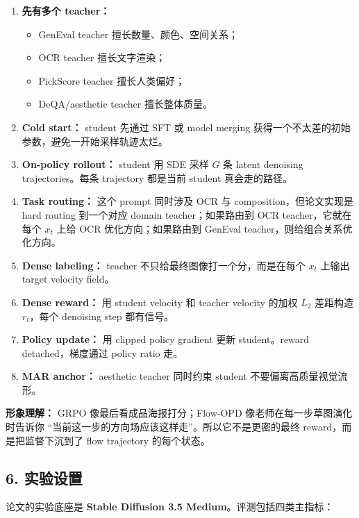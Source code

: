 \begin{enumerate}[leftmargin=1.5em]
  \item \textbf{先有多个 teacher：}
    \begin{itemize}[leftmargin=1.5em]
      \item GenEval teacher 擅长数量、颜色、空间关系；
      \item OCR teacher 擅长文字渲染；
      \item PickScore teacher 擅长人类偏好；
      \item DeQA/aesthetic teacher 擅长整体质量。
    \end{itemize}
  \item \textbf{Cold start：} student 先通过 SFT 或 model merging 获得一个不太差的初始参数，避免一开始采样轨迹太烂。
  \item \textbf{On-policy rollout：} student 用 SDE 采样 $G$ 条 latent denoising trajectories。每条 trajectory 都是当前 student 真会走的路径。
  \item \textbf{Task routing：} 这个 prompt 同时涉及 OCR 与 composition，但论文实现是 hard routing 到一个对应 domain teacher；如果路由到 OCR teacher，它就在每个 $x_t$ 上给 OCR 优化方向；如果路由到 GenEval teacher，则给组合关系优化方向。
  \item \textbf{Dense labeling：} teacher 不只给最终图像打一个分，而是在每个 $x_t$ 上输出 target velocity field。
  \item \textbf{Dense reward：} 用 student velocity 和 teacher velocity 的加权 $L_2$ 差距构造 $r_t$，每个 denoising step 都有信号。
  \item \textbf{Policy update：} 用 clipped policy gradient 更新 student。reward detached，梯度通过 policy ratio 走。
  \item \textbf{MAR anchor：} aesthetic teacher 同时约束 student 不要偏离高质量视觉流形。
\end{enumerate}

\begin{intubox}
\textbf{形象理解：} GRPO 像最后看成品海报打分；Flow-OPD 像老师在每一步草图演化时告诉你 ``当前这一步的方向场应该这样走''。所以它不是更密的最终 reward，而是把监督下沉到了 flow trajectory 的每个状态。
\end{intubox}

\subsection{6. 实验设置}

论文的实验底座是 \textbf{Stable Diffusion 3.5 Medium}。评测包括四类主指标：


